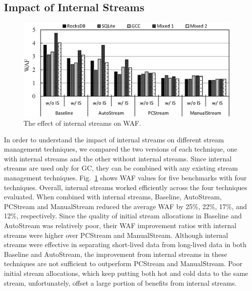 \subsection{Impact of Internal Streams}
\begin{figure}[t]
	\centering
	\includegraphics[width=1.\linewidth]{figure/pcstream/internal}
	\caption{The effect of internal streams on WAF.}
	\label{fig:internal}
\end{figure}

In order to understand the impact of internal streams on different stream
management techniques, we compared the two versions of each technique, one with
internal streams and the other without internal streams.  Since internal
streams are used only for GC, they can be combined with any
existing stream management techniques.  Fig.~\ref{fig:internal} shows WAF values
for five benchmarks with four techniques.  Overall, internal streams worked
efficiently across the four techniques evaluated.   When combined with
internal streams, \textsf{\small Baseline}, \textsf{\small AutoStream},
\textsf{\small PCStream} and \textsf{\small ManualStream} reduced the average
WAF by 25\%, 22\%, 17\%, and 12\%, respectively.  Since the quality of initial
stream allocations in \textsf{\small Baseline} and \textsf{\small AutoStream}
was relatively poor, their WAF improvement ratios with internal streams were
higher over \textsf{\small PCStream} and \textsf{\small ManualStream}.
Although internal streams were effective in separating short-lived data from
long-lived data in both \textsf{\small Baseline} and \textsf{\small
AutoStream}, the improvement from internal streams in these techniques are not
sufficient to outperform \textsf{\small PCStream} and \textsf{\small
ManualStream}.  Poor initial stream allocations, which keep putting both hot
and cold data to the same stream, unfortunately, offset a large portion of
benefits from internal streams.



